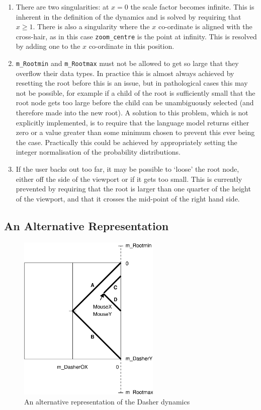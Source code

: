 \documentclass{article}
\begin{document}
\begin{enumerate}
\item There are two singularities: at $x=0$ the scale factor becomes infinite. This is inherent in the definition of the dynamics and is solved by requiring that $x \geq 1$. There is also a singularity where the $x$ co-ordinate is aligned with the cross-hair, as in this case {\tt zoom\_centre} is the point at infinity. This is resolved by adding one to the $x$ co-ordinate in this position.
\item {\tt m\_Rootmin} and {\tt m\_Rootmax} must not be allowed to get so large that they overflow their data types. In practice this is almost always achieved by resetting the root before this is an issue, but in pathological cases this may not be possible, for example if a child of the root is sufficiently small that the root node gets too large before the child can be unambiguously selected (and therefore made into the new root). A solution to this problem, which is not explicitly implemented, is to require that the language model returns either zero or a value greater than some minimum chosen to prevent this ever being the case. Practically this could be achieved by appropriately setting the integer normalisation of the probability distributions.
\item If the user backs out too far, it may be possible to `loose' the root node, either off the side of the viewport or if it gets too small. This is currently prevented by requiring that the root is larger than one quarter of the height of the viewport, and that it crosses the mid-point of the right hand side.
\end{enumerate}

\subsection{An Alternative Representation}
\begin{figure}
\begin{center}
\includegraphics[height=8cm]{geometry2}
\end{center}
\caption{An alternative representation of the Dasher dynamics}
\label{geometry_fig2}
\end{figure}
\end{document}
